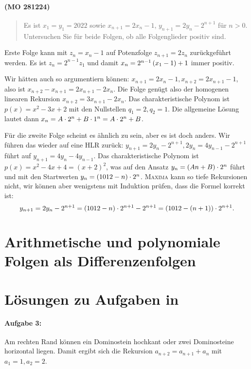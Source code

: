\documentclass[11pt,a4paper]{article}
\newcommand{\cas}[1]{\textsc{#1}}
\begin{document}
\paragraph{(MO 281224)}
\begin{quote}
  Es ist $x_1=y_1=2022$ sowie $x_{n+1}=2x_n-1$, $y_{n+1}=2y_n-2^{n+1}$ für
  $n>0$.  Untersuchen Sie für beide Folgen, ob alle Folgenglieder positiv
  sind.
\end{quote}
\begin{loesung}
  Erste Folge kann mit $z_n=x_n-1$ auf Potenzfolge $z_{n+1}=2z_n$
  zurückgeführt werden. Es ist $z_n=2^{n-1}z_1$ und damit
  $x_n=2^{n-1}\left(x_1-1\right)+1$ immer positiv.

  Wir hätten auch so argumentiern können: $x_{n+1}=2x_n-1,
  x_{n+2}=2x_{n+1}-1$, also ist $x_{n+2}-x_{n+1}=2x_{n+1}-2x_n$. Die Folge
  genügt also der homogenen linearen Rekursion $x_{n+2}=3x_{n+1}-2x_n$.  Das
  charakteristische Polynom ist $p(x)=x^2-3x+2$ mit den Nullstellen $q_1=2,
  q_2=1$. Die allgemeine Lösung lautet dann $x_n=A\cdot 2^n+B\cdot 1^n=A\cdot 2^n+B$.

  Für die zweite Folge scheint es ähnlich zu sein, aber es ist doch anders.
  Wir führen das wieder auf eine HLR zurück: $y_{n+1}=2y_n-2^{n+1},
  2y_n=4y_{n-1}-2^{n+1}$ führt auf $y_{n+1}=4y_n-4y_{n-1}$. Das
  charakteristische Polynom ist $p(x)=x^2-4x+4=(x+2)^2$, was auf den Ansatz
  $y_n=(An+B)\cdot2^n$ führt und mit den Startwerten $y_n=(1012-n)\cdot 2^n$.
  \cas{Maxima} kann so tiefe Rekursionen nicht, wir können aber wenigstens mit
  Induktion prüfen, dass die Formel korrekt ist:
  \begin{gather*}
    y_{n+1}=2y_n-2^{n+1}=(1012-n)\cdot2^{n+1}-2^{n+1}=(1012-(n+1))\cdot2^{n+1}.
  \end{gather*}
\end{loesung}

\section*{Arithmetische und polynomiale Folgen als Differenzenfolgen}


\section*{Lösungen zu Aufgaben in \cite{S}}

\paragraph{Aufgabe 3:}
Am rechten Rand können ein Dominostein hochkant oder zwei Dominosteine
horizontal liegen.  Damit ergibt sich die Rekursion $a_{n+2}=a_{n+1}+a_n$ mit
$a_1=1, a_2=2$.
\end{document}
